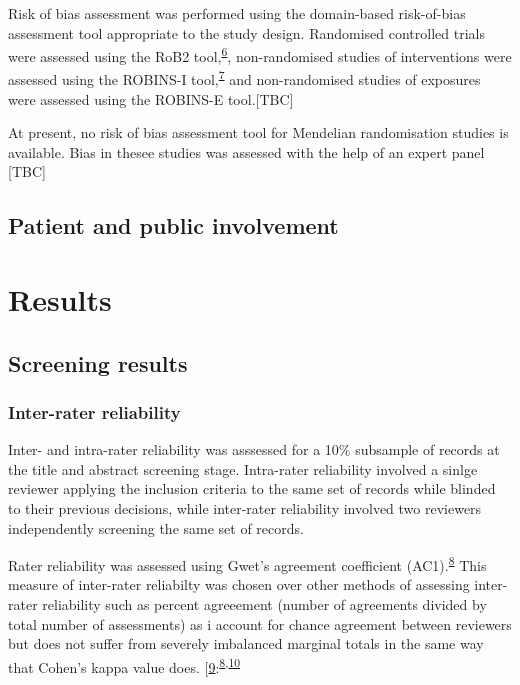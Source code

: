 \documentclass[a4paper, nobind]{templates/ociamthesis}
\begin{document}
Risk of bias assessment was performed using the domain-based risk-of-bias assessment tool appropriate to the study design. Randomised controlled trials were assessed using the RoB2 tool,\textsuperscript{\protect\hyperlink{ref-sterne2019}{6}}, non-randomised studies of interventions were assessed using the ROBINS-I tool,\textsuperscript{\protect\hyperlink{ref-sterne2016}{7}} and non-randomised studies of exposures were assessed using the ROBINS-E tool.{[}TBC{]}

At present, no risk of bias assessment tool for Mendelian randomisation studies is available. Bias in thesee studies was assessed with the help of an expert panel {[}TBC{]}

\hypertarget{patient-and-public-involvement}{%
\subsection{Patient and public involvement}\label{patient-and-public-involvement}}

\hypertarget{results}{%
\section{Results}\label{results}}

\hypertarget{screening-results}{%
\subsection{Screening results}\label{screening-results}}

\hypertarget{inter-rater-reliability}{%
\subsubsection{Inter-rater reliability}\label{inter-rater-reliability}}

Inter- and intra-rater reliability was asssessed for a 10\% subsample of records at the title and abstract screening stage. Intra-rater reliability involved a sinlge reviewer applying the inclusion criteria to the same set of records while blinded to their previous decisions, while inter-rater reliability involved two reviewers independently screening the same set of records.

Rater reliability was assessed using Gwet's agreement coefficient (AC1).\textsuperscript{\protect\hyperlink{ref-gwet2008}{8}} This measure of inter-rater reliabilty was chosen over other methods of assessing inter-rater reliability such as percent agreeement (number of agreements divided by total number of assessments) as i account for chance agreement between reviewers but does not suffer from severely imbalanced marginal totals in the same way that Cohen's kappa value does. {[}\protect\hyperlink{ref-cohen1960}{9}:\textsuperscript{\protect\hyperlink{ref-gwet2008}{8},\protect\hyperlink{ref-wongpakaran2013}{10}}
\end{document}
